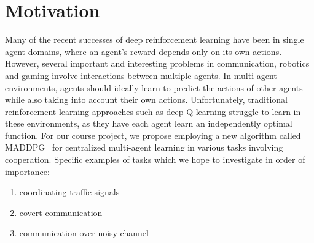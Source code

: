 
\section{Motivation}
\label{sec:motivation}

Many of the recent successes of deep reinforcement learning have been in
single agent domains, where an agent's reward depends only on its own actions.
However, several important and interesting problems in communication, robotics
and gaming involve interactions between multiple agents. In multi-agent
environments, agents should ideally learn to predict the actions of other
agents while also taking into account their own actions. Unfortunately, traditional
reinforcement learning approaches such as deep Q-learning struggle to learn in
these environments, as they have each agent learn an independently optimal
function. For our course project, we propose employing a new algorithm called
MADDPG~\cite{lowe2017multi} for centralized multi-agent learning in various
tasks involving cooperation.
Specific examples of tasks which we hope to investigate in order of importance:
\begin{enumerate}
  \item coordinating traffic signals
  \item covert communication
  \item communication over noisy channel
\end{enumerate}
